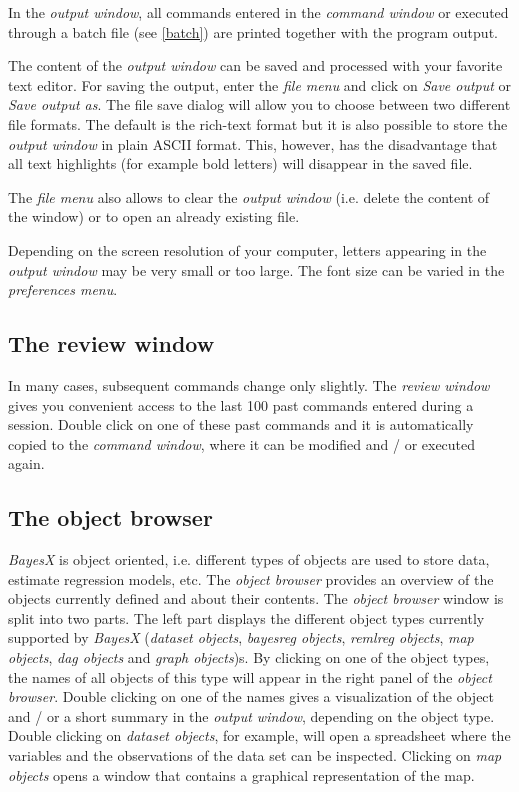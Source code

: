 In the {\em output window}, all commands entered in the {\em
command window} or executed through a batch file (see
\autoref{batch}) are printed together with the program output.

 The content of the {\em output window} can
be saved and processed with your favorite text editor. For saving
the output, enter the {\em file menu} and click on {\em Save output}
or {\em Save output as}. The file save dialog will allow you to
choose between two different file formats. The default is the
rich-text format but it is also possible to store the {\em output
window} in plain ASCII format. This, however, has the disadvantage
that all text highlights (for example bold letters) will disappear
in the saved file.

The {\em file menu} also allows to clear the {\em output window}
(i.e. delete the content of the window) or to open an already
existing file.

Depending on the screen resolution of your computer, letters
appearing in the {\em output window} may be very small or too
large. The font size can be varied in the {\em preferences menu}.

\subsection{The review window}
 

In many cases, subsequent commands change only slightly. The {\em
review window} gives you convenient access to the last 100 past
commands entered during a session. Double click on one of these
past commands and it is automatically copied to the {\em command
window}, where it can be modified and / or executed again.

\subsection{The object browser}

{\em BayesX} is object oriented, i.e. different types of objects
are used to store data, estimate regression models, etc. The {\em
object browser} provides an overview of the objects currently
defined and about their contents. The {\em object browser} window
is split into two parts. The left part displays the different
object types currently supported by {\em BayesX} ({\em dataset
objects}, {\em bayesreg objects}, {\em remlreg objects}, {\em map
objects}, {\em dag objects} and {\em graph objects})s. By clicking
on one of the object types, the names of all objects of this type
will appear in the right panel of the {\em object browser}. Double
clicking on one of the names gives a visualization of the object
and / or a short summary in the {\em output window}, depending on
the object type. Double clicking on {\em dataset objects}, for
example, will open a spreadsheet where the variables and the
observations of the data set can be inspected. Clicking on {\em
map objects} opens a window that contains a graphical
representation of the map.

